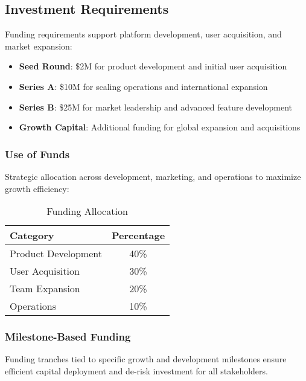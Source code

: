 \subsection{Investment Requirements}

Funding requirements support platform development, user acquisition, and market expansion:

\begin{itemize}
    \item \textbf{Seed Round}: \$2M for product development and initial user acquisition
    \item \textbf{Series A}: \$10M for scaling operations and international expansion
    \item \textbf{Series B}: \$25M for market leadership and advanced feature development
    \item \textbf{Growth Capital}: Additional funding for global expansion and acquisitions
\end{itemize}

\subsubsection{Use of Funds}

Strategic allocation across development, marketing, and operations to maximize growth efficiency:

\begin{table}[H]
\centering
\caption{Funding Allocation}
\label{tab:funding-allocation}
\begin{tabular}{@{}lc@{}}
\toprule
\textbf{Category} & \textbf{Percentage} \\
\midrule
Product Development & 40\% \\
User Acquisition & 30\% \\
Team Expansion & 20\% \\
Operations & 10\% \\
\bottomrule
\end{tabular}
\end{table}

\subsubsection{Milestone-Based Funding}

Funding tranches tied to specific growth and development milestones ensure efficient capital deployment and de-risk investment for all stakeholders.